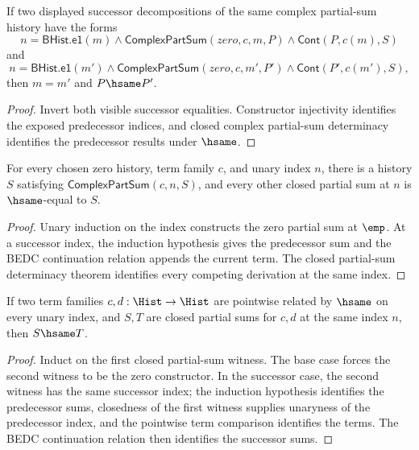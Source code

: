 \begin{lemma}
\label{thm:complex-partsum-visible-previous-decomposition-deterministic}
If two displayed successor decompositions of the same complex partial-sum
history have the forms
$$
n=\mathsf{BHist.e1}(m)\land
\mathsf{ComplexPartSum}(zero,c,m,P)\land \mathsf{Cont}(P,c(m),S)
$$
and
$$
n=\mathsf{BHist.e1}(m')\land
\mathsf{ComplexPartSum}(zero,c,m',P')\land \mathsf{Cont}(P',c(m'),S),
$$
then $m=m'$ and $P\hsame P'$.
\end{lemma}
\begin{proof}
Invert both visible successor equalities. Constructor injectivity identifies
the exposed predecessor indices, and closed complex partial-sum determinacy
identifies the predecessor results under $\hsame$.
\end{proof}

\begin{lemma}
\label{lem:complex-part-sum-exists-unique}
For every chosen zero history, term family \(c\), and unary index \(n\), there
is a history \(S\) satisfying \(\mathsf{ComplexPartSum}(c,n,S)\), and every
other closed partial sum at \(n\) is \(\hsame\)-equal to \(S\).
\end{lemma}
\begin{proof}
Unary induction on the index constructs the zero partial sum at \(\emp\). At a
successor index, the induction hypothesis gives the predecessor sum and the
BEDC continuation relation appends the current term. The closed partial-sum
determinacy theorem identifies every competing derivation at the same index.
\end{proof}

\begin{lemma}
\label{lem:complex-part-sum-term-hsame-deterministic}
If two term families \(c,d:\Hist\to\Hist\) are pointwise related by \(\hsame\)
on every unary index, and \(S,T\) are closed partial sums for \(c,d\) at the
same index \(n\), then \(S\hsame T\).
\end{lemma}
\begin{proof}
Induct on the first closed partial-sum witness. The base case forces the second
witness to be the zero constructor. In the successor case, the second witness
has the same successor index; the induction hypothesis identifies the
predecessor sums, closedness of the first witness supplies unaryness of the
predecessor index, and the pointwise term comparison identifies the terms. The
BEDC continuation relation then identifies the successor sums.
\end{proof}

